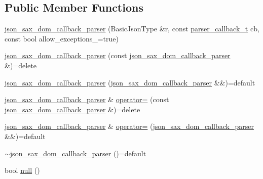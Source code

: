 \subsection*{Public Member Functions}
\begin{DoxyCompactItemize}
\item 
\mbox{\hyperlink{classnlohmann_1_1detail_1_1json__sax__dom__callback__parser_afec9434e54590f10df51b062973d4daf}{json\+\_\+sax\+\_\+dom\+\_\+callback\+\_\+parser}} (Basic\+Json\+Type \&r, const \mbox{\hyperlink{classnlohmann_1_1detail_1_1json__sax__dom__callback__parser_a4f636086fa8e7cf26c35c8afd50903ce}{parser\+\_\+callback\+\_\+t}} cb, const bool allow\+\_\+exceptions\+\_\+=true)
\item 
\mbox{\hyperlink{classnlohmann_1_1detail_1_1json__sax__dom__callback__parser_a589998730e650a425b1b311e2e9f7f09}{json\+\_\+sax\+\_\+dom\+\_\+callback\+\_\+parser}} (const \mbox{\hyperlink{classnlohmann_1_1detail_1_1json__sax__dom__callback__parser}{json\+\_\+sax\+\_\+dom\+\_\+callback\+\_\+parser}} \&)=delete
\item 
\mbox{\hyperlink{classnlohmann_1_1detail_1_1json__sax__dom__callback__parser_af1ce6c746e3ebadb7994170725fcdbb5}{json\+\_\+sax\+\_\+dom\+\_\+callback\+\_\+parser}} (\mbox{\hyperlink{classnlohmann_1_1detail_1_1json__sax__dom__callback__parser}{json\+\_\+sax\+\_\+dom\+\_\+callback\+\_\+parser}} \&\&)=default
\item 
\mbox{\hyperlink{classnlohmann_1_1detail_1_1json__sax__dom__callback__parser}{json\+\_\+sax\+\_\+dom\+\_\+callback\+\_\+parser}} \& \mbox{\hyperlink{classnlohmann_1_1detail_1_1json__sax__dom__callback__parser_a5c9603e79a71713f5e8cf12cba837dbb}{operator=}} (const \mbox{\hyperlink{classnlohmann_1_1detail_1_1json__sax__dom__callback__parser}{json\+\_\+sax\+\_\+dom\+\_\+callback\+\_\+parser}} \&)=delete
\item 
\mbox{\hyperlink{classnlohmann_1_1detail_1_1json__sax__dom__callback__parser}{json\+\_\+sax\+\_\+dom\+\_\+callback\+\_\+parser}} \& \mbox{\hyperlink{classnlohmann_1_1detail_1_1json__sax__dom__callback__parser_a60753ffbec958de15de807852e62cde8}{operator=}} (\mbox{\hyperlink{classnlohmann_1_1detail_1_1json__sax__dom__callback__parser}{json\+\_\+sax\+\_\+dom\+\_\+callback\+\_\+parser}} \&\&)=default
\item 
\mbox{\hyperlink{classnlohmann_1_1detail_1_1json__sax__dom__callback__parser_a54ffcdfb0a8c5c9a876cd003b404ef4b}{$\sim$json\+\_\+sax\+\_\+dom\+\_\+callback\+\_\+parser}} ()=default
\item 
bool \mbox{\hyperlink{classnlohmann_1_1detail_1_1json__sax__dom__callback__parser_a446262b6a75371fe8e0a6218ba2911e6}{null}} ()

\end{DoxyCompactItemize}
